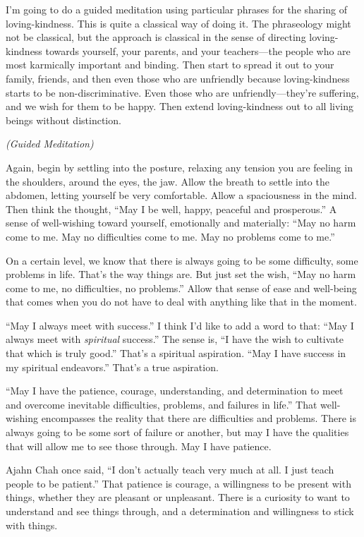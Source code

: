 I’m going to do a guided meditation using particular phrases for the
sharing of loving-kindness. This is quite a classical way of doing it.
The phraseology might not be classical, but the approach is classical in
the sense of directing loving-kindness towards yourself, your parents,
and your teachers—the people who are most karmically important and
binding. Then start to spread it out to your family, friends, and then
even those who are unfriendly because loving-kindness starts to be
non-discriminative. Even those who are unfriendly—they’re suffering, and
we wish for them to be happy. Then extend loving-kindness out to all
living beings without distinction.

\emph{(Guided Meditation)}

Again, begin by settling into the posture, relaxing any tension you are
feeling in the shoulders, around the eyes, the jaw. Allow the breath to
settle into the abdomen, letting yourself be very comfortable. Allow a
spaciousness in the mind. Then think the thought, “May I be well, happy,
peaceful and prosperous.” A sense of well-wishing toward yourself,
emotionally and materially: “May no harm come to me. May no difficulties
come to me. May no problems come to me.”

On a certain level, we know that there is always going to be some
difficulty, some problems in life. That’s the way things are. But just
set the wish, “May no harm come to me, no difficulties, no problems.”
Allow that sense of ease and well-being that comes when you do not have
to deal with anything like that in the moment.

“May I always meet with success.” I think I’d like to add a word to
that: “May I always meet with \emph{spiritual} success.” The sense is,
“I have the wish to cultivate that which is truly good.” That’s a
spiritual aspiration. “May I have success in my spiritual endeavors.”
That’s a true aspiration.

“May I have the patience, courage, understanding, and determination to
meet and overcome inevitable difficulties, problems, and failures in
life.” That well-wishing encompasses the reality that there are
difficulties and problems. There is always going to be some sort of
failure or another, but may I have the qualities that will allow me to
see those through. May I have patience.

Ajahn Chah once said, “I don’t actually teach very much at all. I just
teach people to be patient.” That patience is courage, a willingness to
be present with things, whether they are pleasant or unpleasant. There
is a curiosity to want to understand and see things through, and a
determination and willingness to stick with things.

